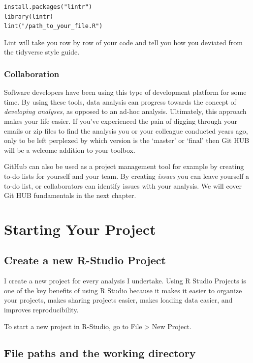 \documentclass[]{book}
\begin{document}
\begin{verbatim}
install.packages("lintr")
library(lintr)
lint("/path_to_your_file.R")
\end{verbatim}

Lint will take you row by row of your code and tell you how you deviated
from the tidyverse style guide.

\subsection{Collaboration}\label{collaboration}

Software developers have been using this type of development platform
for some time. By using these tools, data analysis can progress towards
the concept of \emph{developing analyses}, as opposed to an ad-hoc
analysis. Ultimately, this approach makes your life easier. If you've
experienced the pain of digging through your emails or zip files to find
the analysis you or your colleague conducted years ago, only to be left
perplexed by which version is the `master' or `final' then Git HUB will
be a welcome addition to your toolbox.

GitHub can also be used as a project management tool for example by
creating to-do lists for yourself and your team. By creating
\emph{issues} you can leave yourself a to-do list, or collaborators can
identify issues with your analysis. We will cover Git HUB fundamentals
in the next chapter.

\chapter{Starting Your Project}\label{starting-your-project}

\section{Create a new R-Studio
Project}\label{create-a-new-r-studio-project}

I create a new project for every analysis I undertake. Using R Studio
Projects is one of the key benefits of using R Studio because it makes
it easier to organize your projects, makes sharing projects easier,
makes loading data easier, and improves reproducibility.

To start a new project in R-Studio, go to File \textgreater{} New
Project.

\section{File paths and the working
directory}\label{file-paths-and-the-working-directory}
\end{document}
